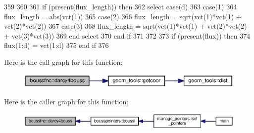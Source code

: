 \begin{DoxyCode}
359 
360 
361         \textcolor{keywordflow}{if} (\textcolor{keyword}{present}(flux\_length)) \textcolor{keywordflow}{then}
362           \textcolor{keywordflow}{select case}(d)
363             \textcolor{keywordflow}{case}(1)
364                   flux\_length = abs(vct(1))
365             \textcolor{keywordflow}{case}(2)
366                   flux\_length = sqrt(vct(1)*vct(1) + vct(2)*vct(2))
367             \textcolor{keywordflow}{case}(3)
368                   flux\_length = sqrt(vct(1)*vct(1) + vct(2)*vct(2) + vct(3)*vct(3))
369 \textcolor{keywordflow}{          end select}
370 \textcolor{keywordflow}{        end if}
371 
372 
373         \textcolor{keywordflow}{if} (\textcolor{keyword}{present}(flux)) \textcolor{keywordflow}{then}
374           flux(1:d) = vct(1:d)
375 \textcolor{keywordflow}{        end if}
376 
\end{DoxyCode}


Here is the call graph for this function\+:\nopagebreak
\begin{figure}[H]
\begin{center}
\leavevmode
\includegraphics[width=350pt]{namespaceboussfnc_afa3ac635ca94f53b4d31b74e208d1ee8_cgraph}
\end{center}
\end{figure}




Here is the caller graph for this function\+:\nopagebreak
\begin{figure}[H]
\begin{center}
\leavevmode
\includegraphics[width=350pt]{namespaceboussfnc_afa3ac635ca94f53b4d31b74e208d1ee8_icgraph}
\end{center}
\end{figure}


